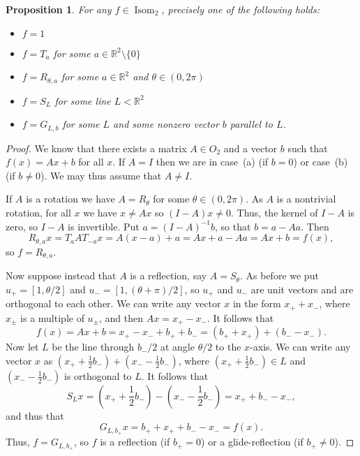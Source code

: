 \documentclass{amsart}
\DeclareMathOperator{\Isom}     {Isom}
\newcommand{\R}         {{\mathbb{R}}}
\newcommand{\half}      {{\textstyle\frac{1}{2}}}
\newcommand{\sm}        {\setminus}
\renewcommand{\:}{\colon}
\newtheorem{proposition}[theorem]{Proposition}
\theoremstyle{definition}
\begin{document}
\begin{proposition}
 For any $f\in \Isom_2$, precisely one of the following holds:
 \begin{itemize}
  \item[(a)] $f=1$
  \item[(b)] $f=T_a$ for some $a\in\R^2\sm\{0\}$
  \item[(c)] $f=R_{\theta,a}$ for some $a\in\R^2$ and $\theta\in(0,2\pi)$
  \item[(d)] $f=S_L$ for some line $L<\R^2$
  \item[(e)] $f=G_{L,b}$ for some $L$ and some nonzero vector $b$
   parallel to $L$.
 \end{itemize}
\end{proposition}
\begin{proof}
 We know that there exists a matrix $A\in O_2$ and a vector $b$ such
 that $f(x)=Ax+b$ for all $x$.  If $A=I$ then we are in case~(a) (if
 $b=0$) or case~(b) (if $b\neq 0$).  We may thus assume that
 $A\neq I$.

 If $A$ is a rotation we have $A=R_\theta$ for some $\theta\in(0,2\pi)$.
 As $A$ is a nontrivial rotation, for all $x$ we have $x\neq Ax$ so
 $(I-A)x\neq 0$.  Thus, the kernel of $I-A$ is zero, so $I-A$ is
 invertible.  Put $a=(I-A)^{-1}b$, so that $b=a-Aa$.  Then
 \[ R_{\theta,a}x=T_a A T_{-a}x=A(x-a) +a=Ax +a-Aa=Ax+b = f(x), \]
 so $f=R_{\theta,a}$.

 Now suppose instead that $A$ is a reflection, say $A=S_\theta$.  As
 before we put $u_+=[1,\theta/2]$ and $u_-=[1,(\theta+\pi)/2]$, so $u_+$
 and $u_-$ are unit vectors and are orthogonal to each other.  We can
 write any vector $x$ in the form $x_++x_-$, where $x_{\pm}$ is a
 multiple of $u_{\pm}$, and then $Ax=x_+-x_-$.  It follows that
 \[ f(x) = Ax+b = x_+ - x_- + b_+ + b_- = (b_+ + x_+) + (b_- - x_-).
 \]
 Now let $L$ be the line through $b_-/2$ at angle $\theta/2$ to the
 $x$-axis.  We can write any vector $x$ as
 $(x_+ +\half b_-)+(x_- -\half b_-)$, where $(x_+ +\half b_-)\in L$
 and $(x_- -\half b_-)$ is orthogonal to $L$.  It follows that
 \[ S_L x = (x_+ + \half b_-) - (x_- -\half b_-) =
             x_+ + b_- - x_-,
 \]
 and thus that
 \[ G_{L,b_+} x = b_+ + x_+ + b_- - x_- = f(x). \]
 Thus, $f=G_{L,b_+}$, so $f$ is a reflection (if $b_+=0$) or a
 glide-reflection (if $b_+\neq 0$).
\end{proof}
\end{document}
